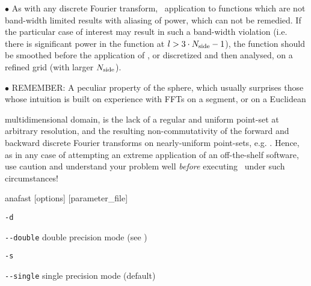 \begin{recommend}
{$\bullet$ As with any discrete Fourier transform, \thedocid\ application to
functions which are not band-width limited results with aliasing
of power, which can not be remedied. If the particular case of interest
may result in such a band-width violation (i.e. there is significant power
in the function at $l > 3 \cdot N_{\mathrm{side}} -1$), the function should
be smoothed before the application of \thedocid, or discretized and
then analysed, on a refined \healpix grid (with larger $N_{\mathrm{side}}$).

$\bullet$ REMEMBER: 
A peculiar property of the sphere, which usually surprises those 
whose intuition is built on experience with FFTs on a segment, or 
on a Euclidean \phantom{xxxxxxxxxxxxxxxxxxxxxxxxx}
}\end{recommend}\begin{recommend_contd}{
multidimensional
domain, is the lack of 
a regular and uniform point-set at arbitrary resolution, 
and the resulting non-commutativity of the forward and
backward discrete Fourier transforms on nearly-uniform point-sets,
e.g. {\healpixns}. Hence,
as in any case of attempting an extreme application of an off-the-shelf
software, use caution and understand your problem well {\it before}
executing \thedocid\ under such circumstances!
}
\end{recommend_contd}

\begin{f90facility}
{anafast [options] [parameter\_file]}
\end{f90facility}

\begin{options}
  \begin{optionlistwide}{} %
    \item[{\tt -d}]
    \item[{\tt -}{\tt -}{\tt double}] double precision mode (see 
)
    \item[{\tt -s}]
    \item[{\tt -}{\tt -}{\tt single}] single precision mode (default)
  \end{optionlistwide}
\end{options}

